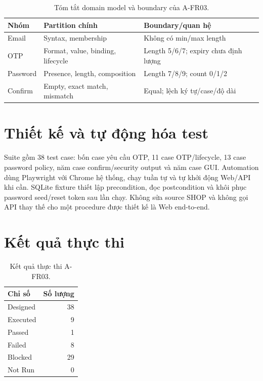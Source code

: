 \begin{table}[H]
  \centering
  \small
  \begin{tabular}{p{}p{}p{}}
    \toprule
    Nhóm & Partition chính & Boundary/quan hệ \\
    \midrule
    Email & Syntax, membership & Không có min/max length \\
    OTP & Format, value, binding, lifecycle & Length 5/6/7; expiry chưa định lượng \\
    Password & Presence, length, composition & Length 7/8/9; count 0/1/2 \\
    Confirm & Empty, exact match, mismatch & Equal; lệch ký tự/case/độ dài \\
    \bottomrule
  \end{tabular}
  \caption{Tóm tắt domain model và boundary của A-FR03.}
\end{table}

\section{Thiết kế và tự động hóa test}

Suite gồm 38 test case: bốn case yêu cầu OTP, 11 case OTP/lifecycle, 13 case
password policy, năm case confirm/security output và năm case GUI. Automation
dùng Playwright với Chrome hệ thống, chạy tuần tự và tự khởi động Web/API khi
cần. SQLite fixture thiết lập precondition, đọc postcondition và khôi phục
password seed/reset token sau lần chạy. Không sửa source SHOP và không gọi API
thay thế cho một procedure được thiết kế là Web end-to-end.

\section{Kết quả thực thi}

\begin{table}[H]
  \centering
  \begin{tabular}{lr}
    \toprule
    Chỉ số & Số lượng \\
    \midrule
    Designed & 38 \\
    Executed & 9 \\
    Passed & 1 \\
    Failed & 8 \\
    Blocked & 29 \\
    Not Run & 0 \\
    \bottomrule
  \end{tabular}
  \caption{Kết quả thực thi A-FR03.}
  \label{tab:a-fr03-result-summary}
\end{table}

